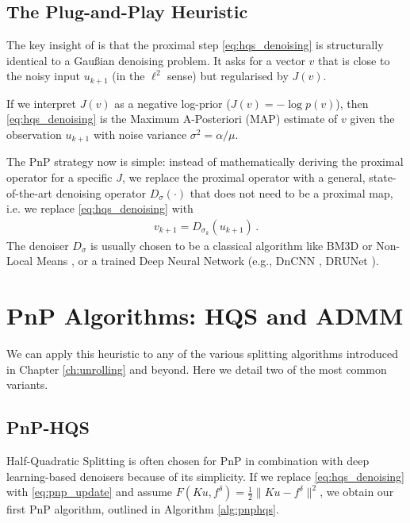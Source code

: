 \subsection{The Plug-and-Play Heuristic}
The key insight of \cite{venkatakrishnan2013plug} is that the proximal step \eqref{eq:hqs_denoising} is structurally identical to a Gau\ss ian denoising problem. It asks for a vector $v$ that is close to the noisy input $u_{k+1}$ (in the $\ell^2$ sense) but regularised by $J(v)$.

If we interpret $J(v)$ as a negative log-prior ($J(v) = -\log p(v)$), then \eqref{eq:hqs_denoising} is the Maximum A-Posteriori (MAP) estimate of $v$ given the observation $u_{k+1}$ with noise variance $\sigma^2 = \alpha/\mu$.

The PnP strategy now is simple: instead of mathematically deriving the proximal operator for a specific $J$, we replace the proximal operator with a general, state-of-the-art denoising operator $D_\sigma(\cdot)$ that does not need to be a proximal map, i.e. we replace \eqref{eq:hqs_denoising} with
\begin{align}
    v_{k+1} = D_{\sigma_k}(u_{k+1}) \, .
    \label{eq:pnp_update}
\end{align}
The denoiser $D_\sigma$ is usually chosen to be a classical algorithm like BM3D \cite{dabov2007image} or Non-Local Means \cite{buades2005non}, or a trained Deep Neural Network (e.g., DnCNN \cite{zhang2017beyond}, DRUNet \cite{zhang2021plug}).

\section{PnP Algorithms: HQS and ADMM}
\label{sec:pnp_algos}

We can apply this heuristic to any of the various splitting algorithms introduced in Chapter \ref{ch:unrolling} and beyond. Here we detail two of the most common variants.

\subsection{PnP-HQS}
Half-Quadratic Splitting is often chosen for PnP in combination with deep learning-based denoisers because of its simplicity. If we replace \eqref{eq:hqs_denoising} with \eqref{eq:pnp_update} and assume $F(Ku, f^\delta) = \frac12 \| Ku - f^\delta \|^2$, we obtain our first PnP algorithm, outlined in Algorithm \ref{alg:pnphqs}.

